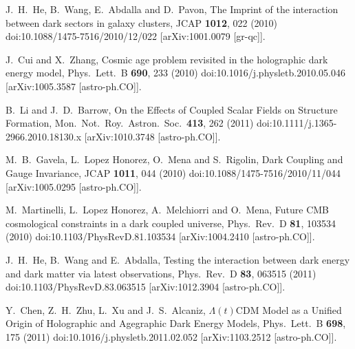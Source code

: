 \documentclass[aps,prd,nofootinbib,amsmath,amssymb,superscriptaddress,twocolumn,10pt]{revtex4}%
\begin{document}
\begin{thebibliography}{99}
  J.~H.~He, B.~Wang, E.~Abdalla and D.~Pavon,
  The Imprint of the interaction between dark sectors in galaxy clusters,
  JCAP {\bf 1012}, 022 (2010)
  doi:10.1088/1475-7516/2010/12/022
  [arXiv:1001.0079 [gr-qc]].

  J.~Cui and X.~Zhang,
  Cosmic age problem revisited in the holographic dark energy model,
  Phys.\ Lett.\ B {\bf 690}, 233 (2010)
  doi:10.1016/j.physletb.2010.05.046
  [arXiv:1005.3587 [astro-ph.CO]].

  B.~Li and J.~D.~Barrow,
  On the Effects of Coupled Scalar Fields on Structure Formation,
  Mon.\ Not.\ Roy.\ Astron.\ Soc.\  {\bf 413}, 262 (2011)
  doi:10.1111/j.1365-2966.2010.18130.x
  [arXiv:1010.3748 [astro-ph.CO]].

  M.~B.~Gavela, L.~Lopez Honorez, O.~Mena and S.~Rigolin,
  Dark Coupling and Gauge Invariance,
  JCAP {\bf 1011}, 044 (2010)
  doi:10.1088/1475-7516/2010/11/044
  [arXiv:1005.0295 [astro-ph.CO]].

  M.~Martinelli, L.~Lopez Honorez, A.~Melchiorri and O.~Mena,
  Future CMB cosmological constraints in a dark coupled universe,
  Phys.\ Rev.\ D {\bf 81}, 103534 (2010)
  doi:10.1103/PhysRevD.81.103534
  [arXiv:1004.2410 [astro-ph.CO]].

  J.~H.~He, B.~Wang and E.~Abdalla,
  Testing the interaction between dark energy and dark matter via latest observations,
  Phys.\ Rev.\ D {\bf 83}, 063515 (2011)
  doi:10.1103/PhysRevD.83.063515
  [arXiv:1012.3904 [astro-ph.CO]].

  Y.~Chen, Z.~H.~Zhu, L.~Xu and J.~S.~Alcaniz,
  $\Lambda(t)$CDM Model as a Unified Origin of Holographic and Agegraphic Dark Energy Models,
  Phys.\ Lett.\ B {\bf 698}, 175 (2011)
  doi:10.1016/j.physletb.2011.02.052
  [arXiv:1103.2512 [astro-ph.CO]].


\end{thebibliography}
\end{document}
